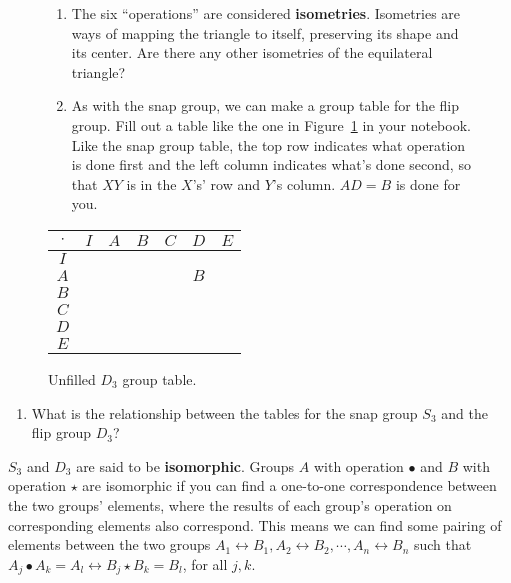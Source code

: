\documentclass[../gatm.tex]{subfiles}
\begin{document}
\begin{figure}[H]
\begin{minipage}{0.6\textwidth}
\begin{enumerate}
\item The six ``operations'' are considered \textbf{isometries}. Isometries are ways of mapping the triangle to itself, preserving its shape and its center. Are there any other isometries of the equilateral triangle?
\item As with the snap group, we can make a group table for the flip group. Fill out a table like the one in Figure~\ref{fig:sbstable} in your notebook. Like the snap group table, the top row indicates what operation is done first and the left column indicates what's done second, so that $XY$ is in the $X$'s' row and $Y$'s column. $AD=B$ is done for you.
\setcounter{enumLast}{\theenumi}
\end{enumerate}
\end{minipage}\hfill%
\begin{minipage}{0.35\textwidth}\centering
\begin{tabular}{C|C|C|C|C|C|C|}
$\cdot$ & $I$ & $A$ & $B$ & $C$ & $D$ & $E$ \\ \hline
$I$    &   &   &   &   &   &   \\ \hline
$A$    &   &   &   &   & $B$  &   \\ \hline
$B$    &   &   &   &   &   &   \\ \hline
$C$    &   &   &   &   &   &   \\ \hline
$D$    &   &   &   &   &   &   \\ \hline
$E$    &   &   &   &   &   &   \\ \hline
\end{tabular}
\caption{Unfilled $D_3$ group table.}
\label{fig:sbstable}
\end{minipage}
\end{figure}
%
\begin{enumerate}
\setcounter{enumi}{\theenumLast}
\item What is the relationship between the tables for the snap group $S_3$ and the flip group $D_3$?
\setcounter{enumLast}{\theenumi}
\end{enumerate}
$S_3$ and $D_3$ are said to be \textbf{isomorphic}. Groups $A$ with operation $\bullet$ and $B$ with operation $\star$ are isomorphic if you can find a one-to-one correspondence between the two groups' elements, where the results of each group's operation on corresponding elements also correspond. This means we can find some pairing of elements between the two groups $A_1\leftrightarrow B_1, A_2\leftrightarrow B_2, \cdots, A_n \leftrightarrow B_n$ such that $A_j \bullet A_k = A_l \leftrightarrow B_j \star B_k = B_l$, for all $j,k$.
\end{document}
